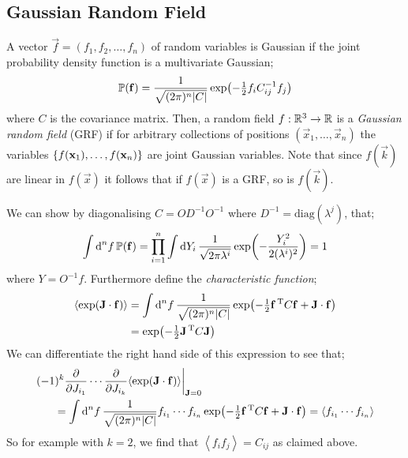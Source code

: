 \subsection{Gaussian Random Field} \label{sec:grf}
\begin{definitionbox}
A vector $\vec f = (f_1, f_2, \ldots, f_n)$ of random variables is Gaussian if the joint probability density function is a multivariate Gaussian;
\begin{equation}
\mathbb{P}(\vec f) = \frac{1}{\sqrt{(2\pi)^n\abs{C}}}\exp\left(-\tfrac{1}{2}f_{i}C^{-1}_{ij}f_j\right)
\end{equation}
where $C$ is the covariance matrix. Then, a random field $f : \mathbb{R}^3 \rightarrow \mathbb{R}$ is a \emph{Gaussian random field} (GRF) if for arbitrary collections of positions $(\vec{x}_1, \ldots, \vec{x}_n)$ the variables $\set{f(\vec{x}_1), \ldots, f(\vec{x}_n)}$ are joint Gaussian variables. Note that since $f(\vec k)$ are linear in $f(\vec x)$ it follows that if $f(\vec x)$ is a GRF, so is $f(\vec k)$.
\end{definitionbox}
We can show by diagonalising $C = O D^{-1} O^{-1}$ where $D^{-1} = \text{diag}(\lambda^j)$, that;
\begin{equation}
\int{\upd{^n f}\mathbb{P}(\vec f)} = \prod_{i = 1}^n {\int{\upd{Y_i}\frac{1}{\sqrt{2\pi \lambda^i}}\exp\left(-\frac{Y_i^2}{2(\lambda^i)^2}\right)}} = 1
\end{equation}
where $Y = O^{-1}f$. Furthermore define the \emph{characteristic function};
\begin{align}
\left< \exp(\vec{J}\cdot \vec{f}) \right> &= \int{\upd{^n f}\frac{1}{\sqrt{(2\pi)^n \abs{C}}}\exp\left(-\tfrac{1}{2}\vec{f}^{\,\text{T}}C \vec{f} + \vec{J}\cdot \vec{f}\right)} \nonumber \\
&= \exp(-\tfrac{1}{2}\vec{J}^{\,\text{T}}C\vec{J})
\end{align}
We can differentiate the right hand side of this expression to see that;
\begin{align*}
\left.(-1)^k\frac{\del}{\del J_{i_1}}\cdots\frac{\del}{\del J_{i_k}}\left< \exp(\vec{J}\cdot \vec{f}) \right>\right|_{\vec J = 0} & \\
= \int{\upd{^n f}\frac{1}{\sqrt{(2\pi)^n \abs{C}}}f_{i_1}\cdots f_{i_n}}&\exp\left(-\tfrac{1}{2}\vec{f}^{\,\text{T}}C \vec{f} + \vec{J}\cdot \vec{f}\right) = \left< f_{i_1}\cdots f_{i_n} \right>
\end{align*}
So for example with $k = 2$, we find that $\left< f_i f_j \right> = C_{ij}$ as claimed above.
